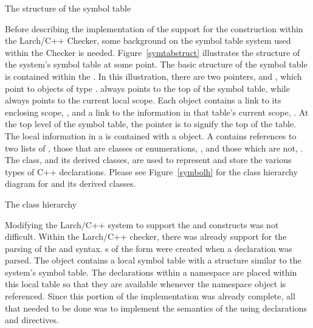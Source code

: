 \begin{BFIGURE}
\begin{center}

\end{center}
\caption{The structure of the symbol table}
\label{symtabstruct}
\end{BFIGURE}

Before describing the implementation of the support for the
 construction 
within the Larch/C++ Checker, some background on the symbol table
system used within the Checker is needed. Figure~\ref{symtabstruct}
illustrates the structure of the system's symbol table at some point.
The basic structure of the symbol table is contained within the
. In this illustration, there are two pointers,
 and , which point to
objects of type .  always
points to the top of the symbol table, while 
always points to the current local scope. Each 
object contains a link to its enclosing scope, , and
a link to the information in that table's current scope,
. At the top level of the symbol table, the
 pointer is
 to signify the top of the table. The local information
in a  is contained with a  object. A
 contains references to two lists of , those
that are classes or enumerations, , and those
which are not, . The  class,
and its derived classes, are used to represent and store the various
types of C++ declarations. Please see Figure~\ref{symbolh} for the class
hierarchy diagram for  and its derived classes.

\begin{BFIGURE}
\begin{center}

\end{center}
\caption{The  class hierarchy}
\label{symbolh}
\end{BFIGURE}

Modifying the Larch/C++ system to support the  and
 constructs was not difficult. Within the Larch/C++
checker, there was already support for the parsing of the
 and  syntax. s of
the form
 were created when a
  declaration was parsed. The
 object contains a local symbol table
with a structure similar to the system's symbol table. The declarations
within a namespace are placed within this local table so that they are
available whenever the namespace object is referenced. Since this
portion of the implementation was already complete, all that needed to
be done was to implement the semantics of the using declarations and
directives.

